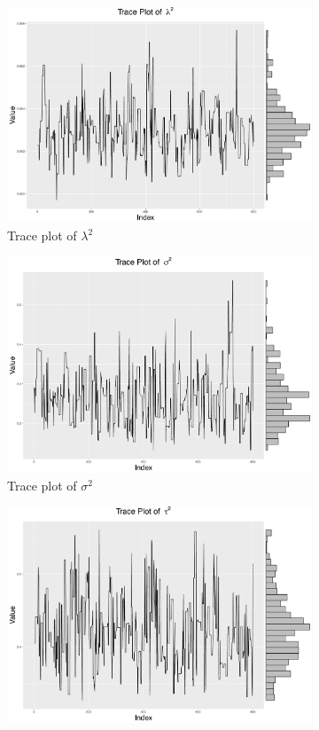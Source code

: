 \begin{figure}[h]
\begin{subfigure}[t]{0.45\textwidth}
	\includegraphics[width=\linewidth]{Chapters/05MCMCOU/plots/realdatalearninglab2.pdf}
	\caption{Trace plot of $\lambda^2$}
\end{subfigure}
\begin{subfigure}[t]{0.45\textwidth}
	\includegraphics[width=\linewidth]{Chapters/05MCMCOU/plots/realdatalearningsig2.pdf}
	\caption{Trace plot of $\sigma^2$}
\end{subfigure}
\begin{subfigure}[t]{0.45\textwidth}
	\includegraphics[width=\linewidth]{Chapters/05MCMCOU/plots/realdatalearningtau2.pdf}

\end{subfigure}
\end{figure}
